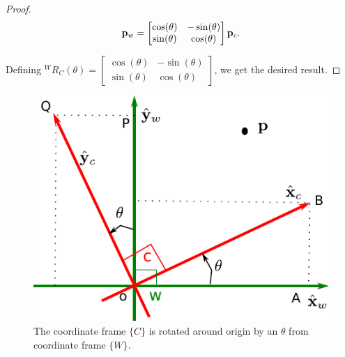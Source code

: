 \documentclass[twocolumn]{article}
\begin{document}
\begin{proof}
    \begin{align}
      \mathbf{p}_w = \begin{bmatrix} \cos(\theta) &  -\sin(\theta) \\
          \sin(\theta) &   \cos(\theta) \end{bmatrix} \mathbf{p}_c.
    \end{align}

    Defining ${}^WR_C(\theta) = \begin{bmatrix} \cos(\theta) &  -\sin(\theta) \\
      \sin(\theta) &   \cos(\theta) \end{bmatrix}$, we get the desired result.

    \end{proof}

\begin{figure}
\includegraphics[width=\linewidth]{media/rot-2D.pdf}
\caption{The coordinate  frame $\{C\}$  is rotated around origin by an $\theta$
  from coordinate  frame $\{W\}$.}
\label{fig:rot-2D}
\end{figure}
\end{document}
